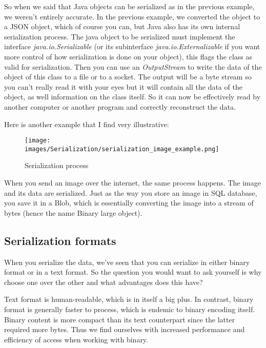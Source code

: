 \documentclass[12pt]{article}
\begin{document}
So when we said that Java objects can be serialized as in the previous example, we weren’t entirely accurate. In the previous example, we converted the object to a JSON object, which of course you can, but Java also has its own internal serialization process. The java object to be serialized must implement the interface \emph{java.io.Serializable} (or its subinterface \emph{java.io.Externalizable} if you want more control of how serialization is done on your object), this flags the class as valid for serialization. Then you can use an \emph{OutputStream} to write the data of the object of this class to a file or to a socket. The output will be a byte stream so you can’t really read it with your eyes but it will contain all the data of the object, as well information on the class itself. So it can now be effectively read by another computer or another program and correctly reconstruct the data.

Here is another example that I find very illustrative:

\begin{figure}[ht!]
 	\centering
 	\caption{Serialization process}
 	\texttt{[image: images/Serialization/serialization\_image\_example.png]}
 	\label{lab:perceptron}
\end{figure}

When you send an image over the internet, the same process happens. The image and its data are serialized. Just as the way you store an image in SQL database, you save it in a Blob, which is essentially converting the image into a stream of bytes (hence the name Binary large object).



\subsection{Serialization formats}
When you serialize the data, we’ve seen that you can serialize in either binary format or in a text format. So the question you would want to ask yourself is why choose one over the other and what advantages does this have?

Text format is human-readable, which is in itself a big plus. In contrast, binary format is generally faster to process, which is endemic to binary encoding itself. Binary content is more compact than its text counterpart since the latter required more bytes. Thus we find ourselves with increased performance and efficiency of access when working with binary.
\end{document}
